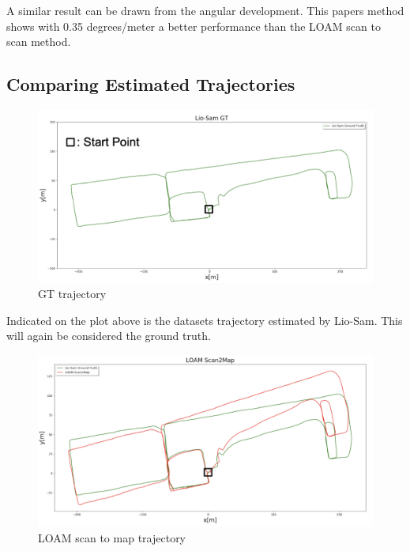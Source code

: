 {{{        A similar result can be drawn from the angular development. This papers method shows with 0.35 degrees/meter a better performance than the LOAM scan to scan method.
    }
    \clearpage

    \subsection{Comparing Estimated Trajectories}{
        \begin{figure}[!ht]
            \centering
            \includegraphics[scale = 0.45]{images/results/GT_trajectory.png}
            \caption{GT trajectory}
            \label{fig:GT_trajectory}
        \end{figure}

        Indicated on the plot above is the datasets trajectory estimated by Lio-Sam. This will again be considered the ground truth.

        \begin{figure}[!ht]
            \centering
            \includegraphics[scale = 0.45]{images/results/loam_s2m_trajectory.png}
            \caption{LOAM scan to map trajectory}
            \label{fig:loam_s2m_trajectory}
        \end{figure}

}}}
